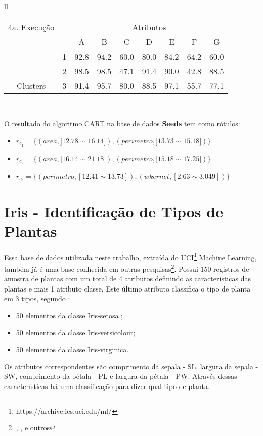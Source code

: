 \begin{table}[!h]
\begin{tabular}{ll}
       \small\addtolength{\tabcolsep}{-4pt}
   \begin{tabular}{|cl|c|c|c|c|c|c|c|}
        \hline \hline
         {\tiny 4a. Execução}       &   & \multicolumn{7}{c|}{Atributos}                                               \\ \cline{3-9} 
       \multicolumn{1}{|l}{}                            &   & A    & B & C & D & E & F & G \\ \hline
        \multicolumn{1}{|c|}{}                           & 1 & 92.8 & 94.2   & 60.0      & 80.0 & 84.2 & 64.2   & 60.0   \\ \cline{2-9} 
        \multicolumn{1}{|c|}{}                           & 2 & 98.5 & 98.5   & 47.1      & 91.4 & 90.0 & 42.8  & 88.5  \\ \cline{2-9} 
        \multicolumn{1}{|c|}{\multirow{-3}{*}{Clusters}} & 3 & 91.4 & 95.7   & 80.0      & 88.5 & 97.1 & 55.7  & 77.1  \\ \hline
   \end{tabular}
   \\
 
 \end{tabular}
 \label{tab:execucoes:seed:cart}
\end{table}

O resultado do algoritmo CART na base de dados \textbf{Seeds} tem como rótulos: 
\begin{itemize}[noitemsep]
 \item ${r_{c_1}=\{ (area, ]12.78 \sim 16.14]), (perimetro, ]13.73 \sim 15.18]) \} }$
 \item ${r_{c_2}=\{ (area, ]16.14 \sim 21.18]), (perimetro, ]15.18 \sim 17.25]) \} }$
 \item ${r_{c_3}=\{ (perimetro, [12.41 \sim 13.73]),  (wkernet, [2.63 \sim 3.049]) \} }$
\end{itemize}


\section{Iris - Identificação de Tipos de Plantas}


Essa base de dados utilizada neste trabalho, extraída do UCI\footnote{https://archive.ics.uci.edu/ml/} Machine Learning, também já é uma base conhecida em outras pesquisas\footnote{\cite{Lopes}, \cite{kotsiantis2005logitboost}, \cite{Filho2015} e outros}. Possui 150 registros de amostra de plantas com um total de 4 atributos  definindo as características das plantas e mais 1 atributo classe. Este último atributo classifica o tipo de planta em 3 tipos, segundo \cite{runkler2012} :
\begin{itemize}[noitemsep]
 \item 50 elementos da classe Iris-setosa ;
 \item 50 elementos da classe Iris-versicolour;
 \item 50 elementos da classe Iris-virginica.
\end{itemize}
Os atributos correspondentes são comprimento da sepala - SL, largura da sepala - SW, comprimento da pétala - PL e
largura da pétala - PW. Através dessas características há uma classificação para dizer qual tipo de planta.

